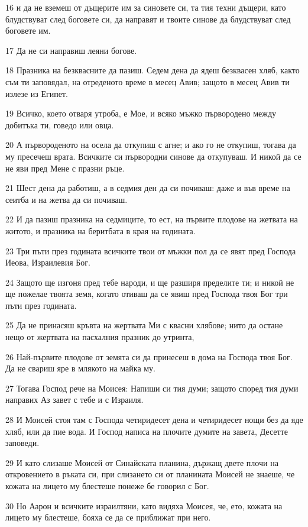 \par 16 и да не вземеш от дъщерите им за синовете си, та тия техни дъщери, като блудствуват след боговете си, да направят и твоите синове да блудствуват след боговете им.
\par 17 Да не си направиш леяни богове.
\par 18 Празника на безквасните да пазиш. Седем дена да ядеш безквасен хляб, както съм ти заповядал, на отреденото време в месец Авив; защото в месец Авив ти излезе из Египет.
\par 19 Всичко, което отваря утроба, е Мое, и всяко мъжко първородено между добитъка ти, говедо или овца.
\par 20 А първороденото на осела да откупиш с агне; и ако го не откупиш, тогава да му пресечеш врата. Всичките си първородни синове да откупуваш. И никой да се не яви пред Мене с празни ръце.
\par 21 Шест дена да работиш, а в седмия ден да си почиваш: даже и във време на сеитба и на жетва да си почиваш.
\par 22 И да пазиш празника на седмиците, то ест, на първите плодове на жетвата на житото, и празника на беритбата в края на годината.
\par 23 Три пъти през годината всичките твои от мъжки пол да се явят пред Господа Иеова, Израилевия Бог.
\par 24 Защото ще изгоня пред тебе народи, и ще разширя пределите ти; и никой не ще пожелае твоята земя, когато отиваш да се явиш пред Господа твоя Бог три пъти през годината.
\par 25 Да не принасяш кръвта на жертвата Ми с квасни хлябове; нито да остане нещо от жертвата на пасхалния празник до утринта,
\par 26 Най-първите плодове от земята си да принесеш в дома на Господа твоя Бог. Да не свариш яре в млякото на майка му.
\par 27 Тогава Господ рече на Моисея: Напиши си тия думи; защото според тия думи направих Аз завет с тебе и с Израиля.
\par 28 И Моисей стоя там с Господа четиридесет дена и четиридесет нощи без да яде хляб, или да пие вода. И Господ написа на плочите думите на завета, Десетте заповеди.
\par 29 И като слизаше Моисей от Синайската планина, държащ двете плочи на откровението в ръката си, при слизането си от планината Моисей не знаеше, че кожата на лицето му блестеше понеже бе говорил с Бог.
\par 30 Но Аарон и всичките израилтяни, като видяха Моисея, че, ето, кожата на лицето му блестеше, бояха се да се приближат при него.
